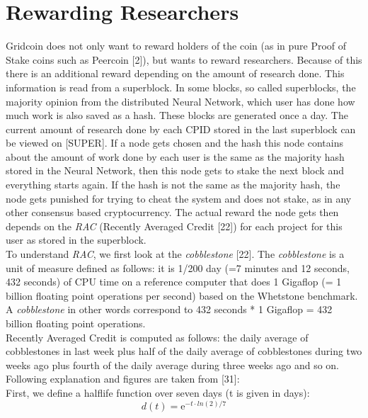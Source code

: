 \section{Rewarding Researchers}

Gridcoin does not only want to reward holders of the coin (as in pure Proof of Stake coins such as Peercoin [2]), but wants to reward researchers. Because of this there is an additional reward depending on the amount of research done. This information is read from a superblock. In some blocks, so called superblocks, the majority opinion from the distributed Neural Network, which user has done how much work is also saved as a hash. These blocks are generated once a day. The current amount of research done by each CPID stored in the last superblock can be viewed on [SUPER]. If a node gets chosen and the hash this node contains about the amount of work done by each user is the same as the majority hash stored in the Neural Network, then this node gets to stake the next block and everything starts again. If the hash is not the same as the majority hash, the node gets punished for trying to cheat the system and does not stake, as in any other consensus based cryptocurrency. The actual reward the node gets then depends on the \textit{RAC} (Recently Averaged Credit [22]) for each project for this user as stored in the superblock.\\

To understand \textit{RAC}, we first look at the \textit{cobblestone} [22]. The \textit{cobblestone} is a unit of measure defined as follows: it is 1/200 day (=7 minutes and 12 seconds, 432 seconds) of CPU time on a reference computer that does 1 Gigaflop (= 1 billion floating point operations per second) based on the Whetstone benchmark. A \textit{cobblestone} in other words correspond to 432 seconds * 1 Gigaflop = 432 billion floating point operations.\\

Recently Averaged Credit is computed as follows: the daily average of cobblestones in last week plus half of the daily average of cobblestones during two weeks ago plus fourth of the daily average during three weeks ago and so on. Following explanation and figures are taken from [31]:\\

First, we define a halflife function over seven days (t is given in days):\\

\begin{equation}
d(t) =  \mathrm{e}^{-t \cdot  ln(2) / 7}  
\end{equation}

